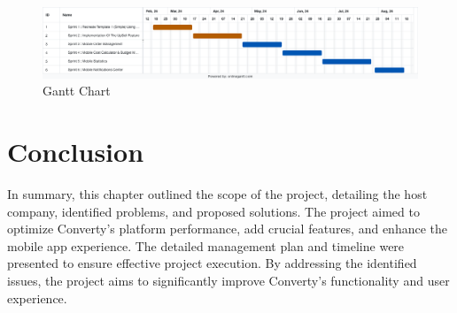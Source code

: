 \begin{figure}[H]
  \centering
  \includegraphics[width=1\textwidth]{Images/Online Gantt 20240715.png}
  \caption{Gantt Chart}
  \label{fig:Gantt Chart}
\end{figure}

\section{Conclusion}
In summary, this chapter outlined the scope of the project, detailing the host company, identified problems, and proposed solutions. The project aimed to optimize Converty's platform performance, add crucial features, and enhance the mobile app experience. The detailed management plan and timeline were presented to ensure effective project execution. By addressing the identified issues, the project aims to significantly improve Converty's functionality and user experience.
